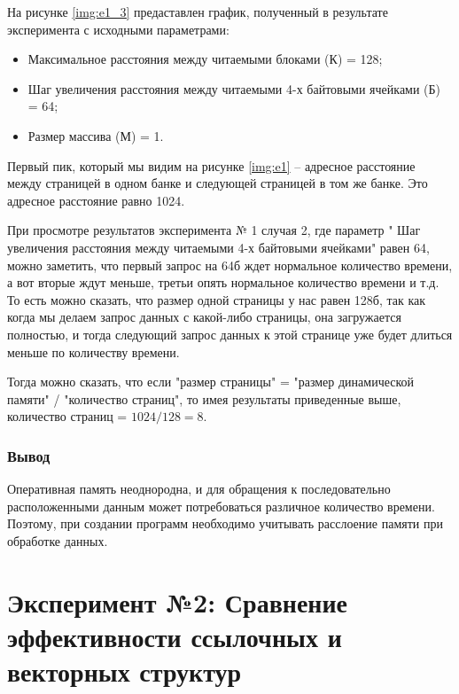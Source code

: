 \newpage

На рисунке \ref{img:e1_3} предаставлен график, полученный в результате эксперимента с исходными параметрами:
\begin{itemize}
	\item Максимальное расстояния между	читаемыми блоками (К) = 128;
	\item Шаг увеличения расстояния между читаемыми 4-х байтовыми ячейками (Б) = 64;
	\item Размер массива (М) = 1.
\end{itemize}


Первый пик, который мы видим на рисунке \ref{img:e1} -- адресное расстояние между страницей в одном банке и следующей страницей в том же банке. Это адресное расстояние равно 1024.

При просмотре результатов эксперимента № 1 случая 2, где параметр " Шаг увеличения расстояния между читаемыми 4-х байтовыми ячейками" равен 64, можно заметить, что первый запрос на 64б ждет нормальное количество времени, а вот вторые ждут меньше, третьи опять нормальное количество времени и т.д. То есть можно сказать, что размер одной страницы у нас равен 128б, так как когда мы делаем запрос данных с какой-либо страницы, она загружается полностью, и тогда следующий запрос данных к этой странице уже будет длиться меньше по количеству времени. 

Тогда можно сказать, что если "размер страницы" = "размер динамической памяти" / "количество страниц", то имея результаты приведенные выше, количество страниц = $1024 / 128 = 8$.

\subsection*{Вывод}
Оперативная память неоднородна, и для обращения к последовательно расположенными данным может потребоваться различное количество времени. Поэтому, при создании программ необходимо учитывать расслоение памяти при обработке данных.


\chapter*{Эксперимент №2: Сравнение эффективности ссылочных и векторных структур}

